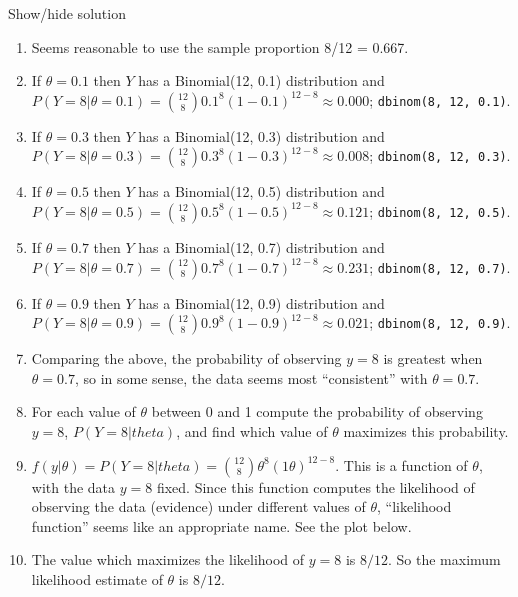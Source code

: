 \documentclass[
]{book}
\providecommand{\tightlist}{%
  \setlength{\itemsep}{0pt}\setlength{\parskip}{0pt}}
\theoremstyle{definition}
\theoremstyle{definition}
\theoremstyle{definition}
\theoremstyle{remark}
\begin{document}
Show/hide solution

\begin{enumerate}
\def\labelenumi{\arabic{enumi}.}
\tightlist
\item
  Seems reasonable to use the sample proportion 8/12 = 0.667.
\item
  If \(\theta=0.1\) then \(Y\) has a Binomial(12, 0.1) distribution and \(P(Y = 8|\theta = 0.1) = \binom{12}{8}0.1^8(1-0.1)^{12-8}\approx 0.000\); \texttt{dbinom(8,\ 12,\ 0.1)}.
\item
  If \(\theta=0.3\) then \(Y\) has a Binomial(12, 0.3) distribution and \(P(Y = 8|\theta = 0.3) = \binom{12}{8}0.3^8(1-0.3)^{12-8}\approx 0.008\); \texttt{dbinom(8,\ 12,\ 0.3)}.
\item
  If \(\theta=0.5\) then \(Y\) has a Binomial(12, 0.5) distribution and \(P(Y = 8|\theta = 0.5) = \binom{12}{8}0.5^8(1-0.5)^{12-8}\approx 0.121\); \texttt{dbinom(8,\ 12,\ 0.5)}.
\item
  If \(\theta=0.7\) then \(Y\) has a Binomial(12, 0.7) distribution and \(P(Y = 8|\theta = 0.7) = \binom{12}{8}0.7^8(1-0.7)^{12-8}\approx 0.231\); \texttt{dbinom(8,\ 12,\ 0.7)}.
\item
  If \(\theta=0.9\) then \(Y\) has a Binomial(12, 0.9) distribution and \(P(Y = 8|\theta = 0.9) = \binom{12}{8}0.9^8(1-0.9)^{12-8}\approx 0.021\); \texttt{dbinom(8,\ 12,\ 0.9)}.
\item
  Comparing the above, the probability of observing \(y=8\) is greatest when \(\theta=0.7\), so in some sense, the data seems most ``consistent'' with \(\theta=0.7\).
\item
  For each value of \(\theta\) between 0 and 1 compute the probability of observing \(y=8\), \(P(Y = 8|theta)\), and find which value of \(\theta\) maximizes this probability.\\
\item
  \(f(y|\theta)=P(Y=8|theta) = \binom{12}{8}\theta^8(1\theta)^{12-8}\). This is a function of \(\theta\), with the data \(y=8\) fixed. Since this function computes the likelihood of observing the data (evidence) under different values of \(\theta\), ``likelihood function'' seems like an appropriate name. See the plot below.
\item
  The value which maximizes the likelihood of \(y=8\) is \(8/12\). So the maximum likelihood estimate of \(\theta\) is \(8/12\).
\end{enumerate}
\end{document}
